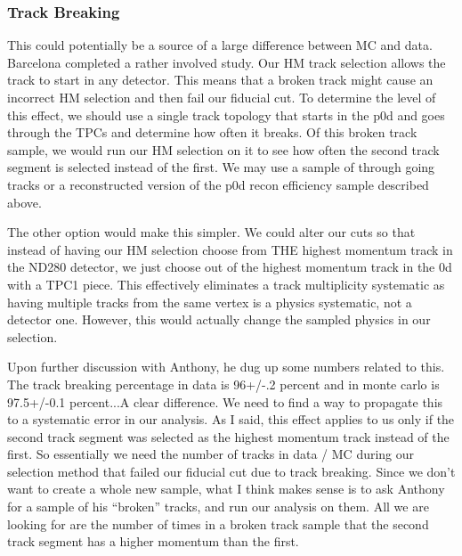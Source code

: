\subsubsection{Track Breaking}
\label{sec:Systematics_TrackBreaking}

{\color{red} This could potentially be a source of a large difference between MC
and data. Barcelona completed a rather involved study. Our HM track selection
allows the track to start in any detector. This means that a broken track might
cause an incorrect HM selection and then fail our fiducial cut. To determine the
level of this effect, we should use a single track topology that starts in the
p0d and goes through the TPCs and determine how often it breaks. Of this broken
track sample, we would run our HM selection on it to see how often the second
track segment is selected instead of the first. We may use a sample of through
going tracks or a reconstructed version of the p0d recon efficiency sample
described above.

The other option would make this simpler. We could alter our cuts so that
instead of having our HM selection choose from THE highest momentum track in the
ND280 detector, we just choose out of the highest momentum track in the \p0d with
a TPC1 piece. This effectively eliminates a track multiplicity systematic as
having multiple tracks from the same vertex is a physics systematic, not a
detector one. However, this would actually change the sampled physics in our
selection.

Upon further discussion with Anthony, he dug up some numbers related to this.
The track breaking percentage in data is 96+/-.2 percent and in monte carlo is
97.5+/-0.1 percent...A clear difference. We need to find a way to propagate this
to a systematic error in our analysis. As I said, this effect applies to us only
if the second track segment was selected as the highest momentum track instead
of the first. So essentially we need the number of tracks in data / MC during
our selection method that failed our fiducial cut due to track breaking. Since
we don't want to create a whole new sample, what I think makes sense is to ask
Anthony for a sample of his "`broken"' tracks, and run our analysis on them. All
we are looking for are the number of times in a broken track sample that the
second track segment has a higher momentum than the first.

}
